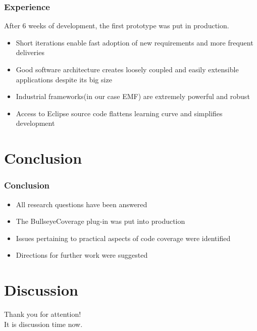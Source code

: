 \documentclass{beamer}
\begin{document}
\begin{frame}
  \frametitle{Experience}
After 6 weeks of development, the first prototype was put in production.
\begin{itemize}
  \item Short iterations enable fast adoption of new requirements and more frequent deliveries
  \item Good software architecture creates loosely coupled and easily extensible applications despite its big size
  \item Industrial frameworks(in our case EMF) are extremely powerful and robust
  \item Access to Eclipse source code flattens learning curve and simplifies development
\end{itemize}
\end{frame}

\section{Conclusion}

\begin{frame}
  \frametitle{Conclusion}
\begin{itemize}
  \item All research questions have been answered
  \item The BullseyeCoverage plug-in was put into production
  \item Issues pertaining to practical aspects of code coverage were identified
  \item Directions for further work were suggested
\end{itemize}
\end{frame}

\section{Discussion}

\begin{frame}
\begin{center}
  Thank you for attention!\\
  It is discussion time now.
\end{center}
\end{frame}
\end{document}
